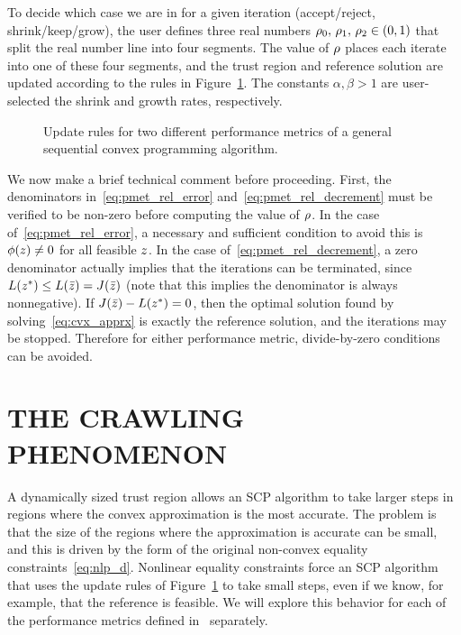 \documentclass[letterpaper, 10 pt, conference]{ieeeconf}
\begin{document}
To decide which case we are in for a given iteration (accept/reject, shrink/keep/grow), the user defines three real numbers $\rho_0,\,\rho_1,\,\rho_2\in(0,1)$ that split the real number line into four segments. The value of $\rho$ places each iterate into one of these four segments, and the trust region and reference solution are updated according to the rules in Figure~\ref{fig:scp_updates}. The constants $\alpha,\beta >1$ are user-selected the shrink and growth rates, respectively. 

\begin{figure}
\centering

\caption{Update rules for two different performance metrics of a general sequential convex programming algorithm.}
\label{fig:scp_updates}
\end{figure}

We now make a brief technical comment before proceeding. First, the denominators in~\eqref{eq:pmet_rel_error} and~\eqref{eq:pmet_rel_decrement} must be verified to be non-zero before computing the value of $\rho$. In the case of~\eqref{eq:pmet_rel_error}, a necessary and sufficient condition to avoid this is $\phi(z)\ne0$ for all feasible $z$. In the case of~\eqref{eq:pmet_rel_decrement}, a zero denominator actually implies that the iterations can be terminated, since $L(z^*) \leq L(\bar{z}) = J(\bar{z})$ (note that this implies the denominator is always nonnegative). If $J(\bar{z})-L(z^*)=0$, then the optimal solution found by solving~\eqref{eq:cvx_apprx} is exactly the reference solution, and the iterations may be stopped. Therefore for either performance metric, divide-by-zero conditions can be avoided.   

\section{THE CRAWLING PHENOMENON}\label{sec:crawling}

A dynamically sized trust region allows an SCP algorithm to take larger steps in regions where the convex approximation is the most accurate. The problem is that the size of the regions where the approximation is accurate can be small, and this is driven by the form of the original non-convex equality constraints~\eqref{eq:nlp_d}. Nonlinear equality constraints force an SCP algorithm that uses the update rules of Figure~\ref{fig:scp_updates} to take small steps, even if we know, for example, that the reference is feasible. We will explore this behavior for each of the performance metrics defined in~ separately.
\end{document}
